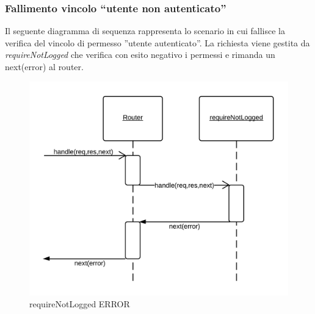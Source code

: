 \subsubsection{Fallimento vincolo ``utente non autenticato''}
Il seguente diagramma di sequenza rappresenta lo scenario in cui fallisce la verifica del vincolo di permesso ''utente autenticato''.
La richiesta viene gestita da \emph{requireNotLogged} che verifica con esito negativo i permessi e rimanda un next(error) al router.
\begin{figure}[H]
	\begin{center} 
		\includegraphics[scale=0.20]{scenari/requireNotLogged ERROR.png} 
		\caption{requireNotLogged ERROR}
	\end{center} 
\end{figure}

